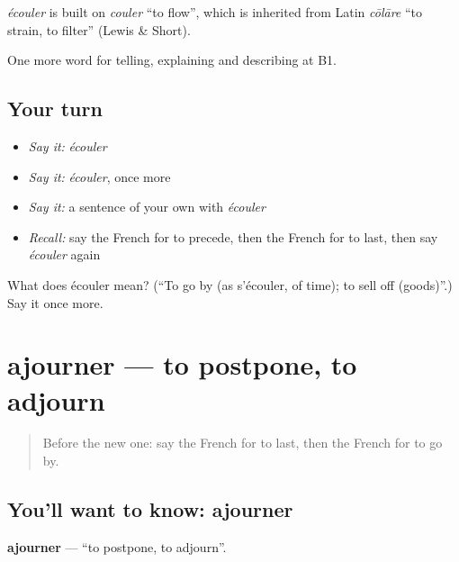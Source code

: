 \begin{cousinweb}
\emph{écouler} is built on \emph{couler} \textquotedblleft{}to flow\textquotedblright{}, which is inherited from Latin \emph{cōlāre} \textquotedblleft{}to strain, to filter\textquotedblright{} (Lewis \& Short).
\end{cousinweb}

\begin{grammarlens}[title={What you've built}]
One more word for telling, explaining and describing at B1.
\end{grammarlens}

\subsection*{Your turn}
\begin{itemize}
\raggedright
  \item \emph{Say it:} \emph{écouler}
  \item \emph{Say it:} \emph{écouler}, once more
  \item \emph{Say it:} a sentence of your own with \emph{écouler}
  \item \emph{Recall:} say the French for to precede, then the French for to last, then say \emph{écouler} again
\end{itemize}

\begin{tcolorbox}[breakable,colback=teal!4,colframe=teal!35!black,title={Before you move on}]
What does écouler mean? (\textquotedblleft{}To go by (as s'écouler, of time); to sell off (goods)\textquotedblright{}.) Say it once more.
\end{tcolorbox}
\section[ajourner]{ajourner — to postpone, to adjourn}

\label{lesson:FR-C275-ajourner}



\begin{quote}
Before the new one: say the French for to last, then the French for to go by.
\end{quote}

\subsection*{You'll want to know: ajourner}
\textbf{ajourner} — \textquotedblleft{}to postpone, to adjourn\textquotedblright{}.

